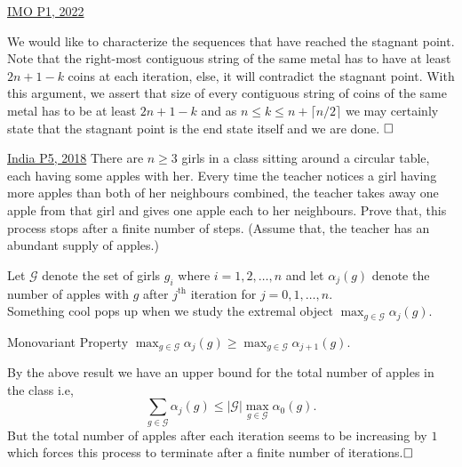 \begin{problem}{3}{\href{https://artofproblemsolving.com/community/q1h2883211p34203276}{IMO P1, 2022}}
\begin{solution}
	\indent We would like to characterize the sequences that have reached the stagnant point. Note that the right-most contiguous string of the same metal has to have at least $2n+1-k$ coins at each iteration, else, it will contradict the stagnant point. With this argument, we assert that size of every contiguous string of coins of the same metal has to be at least $2n+1-k$ and as $n\le k\le n+\lceil n/2\rceil$ we may certainly state that the stagnant point is the end state itself and we are done. $\qedwhite$
	\end{solution}
\end{problem}
	
\begin{problem}{4}{\href{https://artofproblemsolving.com/community/q1h1578516p32946994}{India P5, 2018}}
	There are $n\ge 3$ girls in a class sitting around a circular table, each having some apples with her. Every time the teacher notices a girl having more apples than both of her neighbours combined, the teacher takes away one apple from that girl and gives one apple each to her neighbours. Prove that, this process stops after a finite number of steps. (Assume that, the teacher has an abundant supply of apples.)
	\begin{solution}Let $\mathcal{G}$ denote the set of girls $g_i$ where $i=1,2,\ldots,n $ and let $\alpha_j(g)$ denote the number of apples with $g$ after $j^{\text{th}}$ iteration for $j=0,1,\ldots,n$.\\
	Something cool pops up when we study the extremal object $\displaystyle\max_{g\in\mathcal{G}}\alpha_j{(g)}$.

	\begin{lemma}{1}{Monovariant Property}
		$\displaystyle\max_{g\in\mathcal{G}}\alpha_{j}{(g)}\ge \displaystyle\max_{g\in\mathcal{G}}\alpha_{j+1}{(g)}$.
	\end{lemma}
	By the above result we have an upper bound for the total number of apples in the class i.e,
$$\sum_{g\in\mathcal{G}}\alpha_{j}(g)\le |\mathcal{G}|\max_{g\in\mathcal{G}}\alpha_{0}{(g)}.$$But the total number of apples after each iteration seems to be increasing by $1$ which forces this process to terminate after a finite number of iterations.$\qedwhite$
	\end{solution}
\end{problem}
